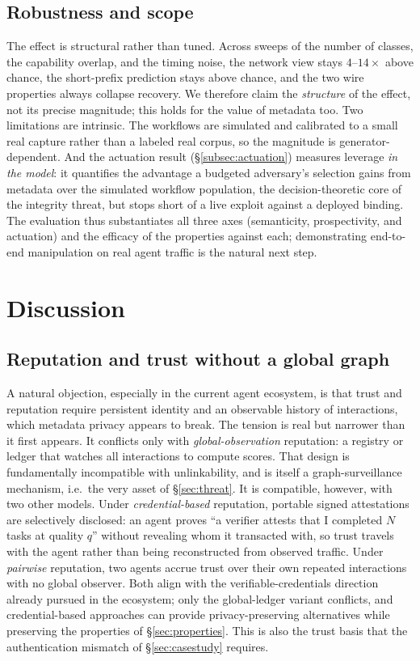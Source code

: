 \documentclass[10pt,twocolumn]{article}
\theoremstyle{definition}
\begin{document}
\subsection{Robustness and scope}
The effect is structural rather than tuned. Across sweeps of the number of classes,
the capability overlap, and the timing noise, the network view stays $4$--$14\times$
above chance, the short-prefix prediction stays above chance, and the two wire
properties always collapse recovery. We therefore claim the \emph{structure} of the
effect, not its precise magnitude; this holds for the value of metadata too. Two limitations
are intrinsic. The workflows are simulated and calibrated to a small real capture
rather than a labeled real corpus, so the magnitude is generator-dependent. And the
actuation result (\S\ref{subsec:actuation}) measures leverage \emph{in the model}: it
quantifies the advantage a budgeted adversary's selection gains from metadata over the
simulated workflow population, the decision-theoretic core of the integrity threat,
but stops short of a live exploit against a deployed binding. The evaluation thus
substantiates all three axes (semanticity, prospectivity, and actuation) and the
efficacy of the properties against each; demonstrating end-to-end manipulation on real
agent traffic is the natural next step.

\section{Discussion}\label{sec:discussion}

\subsection{Reputation and trust without a global graph}
A natural objection, especially in the current agent ecosystem, is that trust and
reputation require persistent identity and an observable history of interactions,
which metadata privacy appears to break. The tension is real but narrower than it
first appears. It conflicts only with \emph{global-observation} reputation: a
registry or ledger that watches all interactions to compute scores. That design is
fundamentally incompatible with unlinkability, and is itself a graph-surveillance
mechanism, i.e.\ the very asset of \S\ref{sec:threat}. It is compatible, however,
with two other models. Under \emph{credential-based} reputation, portable signed
attestations are selectively disclosed: an agent proves ``a verifier attests that I
completed $N$ tasks at quality $q$'' without revealing whom it transacted with, so
trust travels with the agent rather than being reconstructed from observed traffic.
Under \emph{pairwise} reputation, two agents accrue trust over their own repeated
interactions with no global observer. Both align with the verifiable-credentials
direction already pursued in the ecosystem; only the global-ledger variant
conflicts, and credential-based approaches can provide privacy-preserving
alternatives while preserving the properties of \S\ref{sec:properties}. This is also the trust basis that the authentication
mismatch of \S\ref{sec:casestudy} requires.
\end{document}

